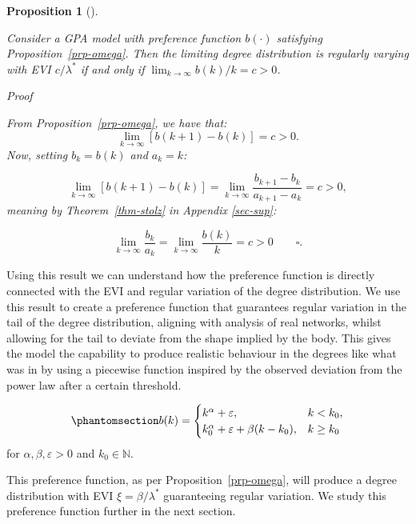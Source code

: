 \documentclass[
  sn-basic,
]{sn-jnl}
\theoremstyle{plain}
\theoremstyle{plain}
\newtheorem{proposition}{Proposition}[section]
\theoremstyle{remark}
\begin{document}
\begin{proposition}[]\protect\hypertarget{prp-omega2}{}\label{prp-omega2}

Consider a GPA model with preference function \(b(\cdot)\) satisfying
Proposition~\ref{prp-omega}. Then the limiting degree distribution is
regularly varying with EVI \(c/\lambda^{*}\) if and only if
\(\lim_{k\rightarrow\infty}b(k)/k = c > 0\).

\emph{Proof}

From Proposition~\ref{prp-omega}, we have that: \[
\lim_{k\rightarrow\infty}[b(k+1)-b(k)] = c>0.
\] Now, setting \(b_k = b(k)\) and \(a_k = k\):

\[
\lim_{k\rightarrow\infty}[b(k+1)-b(k)] = \lim_{k\rightarrow\infty}\frac{b_{k+1} - b_k}{a_{k+1} - a_k} = c>0,
\] meaning by Theorem~\ref{thm-stolz} in Appendix \ref{sec-sup}:

\[
\lim_{k\rightarrow\infty}\frac{b_k}{a_k} = \lim_{k\rightarrow\infty}\frac{b(k)}{k} = c>0\qquad \square.
\]

\end{proposition}

Using this result we can understand how the preference function is
directly connected with the EVI and regular variation of the degree
distribution. We use this result to create a preference function that
guarantees regular variation in the tail of the degree distribution,
aligning with analysis of real networks, whilst allowing for the tail to
deviate from the shape implied by the body. This gives the model the
capability to produce realistic behaviour in the degrees like what was
in \citet{Lee24} by using a piecewise function inspired by the observed
deviation from the power law after a certain threshold.

\begin{equation}\phantomsection\label{eq-pref}{
b(k) = \begin{cases}
k^\alpha + \varepsilon,&k<k_0,\\
k_0^\alpha + \varepsilon + \beta(k-k_0), &k\ge k_0
\end{cases}
}\end{equation} for \(\alpha,\beta, \varepsilon>0\) and
\(k_0\in\mathbb N\).

This preference function, as per Proposition~\ref{prp-omega}, will
produce a degree distribution with EVI \(\xi=\beta/\lambda^*\)
guaranteeing regular variation. We study this preference function
further in the next section.

\newpage
\end{document}

